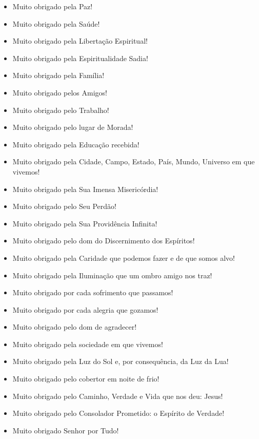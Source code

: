 \begin{itemize}
    \item Muito obrigado pela Paz!
    \item Muito obrigado pela Saúde!
    \item Muito obrigado pela Libertação Espiritual!
    \item Muito obrigado pela Espiritualidade Sadia!
    \item Muito obrigado pela Família!
    \item Muito obrigado pelos Amigos!
    \item Muito obrigado pelo Trabalho!
    \item Muito obrigado pelo lugar de Morada!
    \item Muito obrigado pela Educação recebida!
    \item Muito obrigado pela Cidade, Campo, Estado, País, Mundo, Universo em que vivemos!
    \item Muito obrigado pela Sua Imensa Misericórdia!
    \item Muito obrigado pelo Seu Perdão!
    \item Muito obrigado pela Sua Providência Infinita!
    \item Muito obrigado pelo dom do Discernimento dos Espíritos!
    \item Muito obrigado pela Caridade que podemos fazer e de que somos alvo!
    \item Muito obrigado pela Iluminação que um ombro amigo nos traz!
    \item Muito obrigado por cada sofrimento que passamos!
    \item Muito obrigado por cada alegria que gozamos!
    \item Muito obrigado pelo dom de agradecer!
    \item Muito obrigado pela sociedade em que vivemos!
    \item Muito obrigado pela Luz do Sol e, por consequência, da Luz da Lua!
    \item Muito obrigado pelo cobertor em noite de frio!
    \item Muito obrigado pelo Caminho, Verdade e Vida que nos deu: Jesus!
    \item Muito obrigado pelo Consolador Prometido: o Espírito de Verdade!
    \item Muito obrigado Senhor por Tudo!
\end{itemize}

